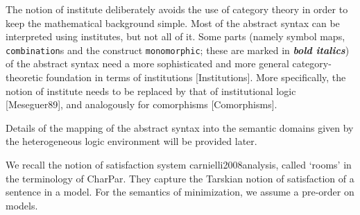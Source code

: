 \documentclass[10pt,%
\ifpretendfinal
final%
\else
draft%
\fi,
]{scrreprt}
\newcommand*{\institutionsOnly}{\bfseries\itshape}
\newcommand*{\syntax}[1]{\texttt{#1}}
\newcommand{\bref}[1]{[\ref{#1}]}
\renewcommand{\bref}[1]{#1}
\begin{document}
The notion of institute deliberately avoids the use of category theory
in order to keep the mathematical background simple.  Most of the
abstract syntax can be interpreted using institutes, but not all of
it. Some parts (namely symbol maps, \syntax{combination}s
 and the construct \syntax{monomorphic};
these are marked in {\institutionsOnly bold italics}) of the abstract
syntax need a more sophisticated and more general category-theoretic
foundation in terms of institutions [\bref{Institutions}]. More
specifically, the notion of institute needs to be replaced by that of
institutional logic [\bref{Meseguer89}], and analogously for
comorphisms [\bref{Comorphisms}].

Details of the mapping of the abstract syntax into the semantic
domains given by the heterogeneous logic environment will be provided later.







We recall the notion of satisfaction system
\bref{carnielli2008analysis}, called `rooms' in the terminology of
\bref{CharPar}. They capture the Tarskian notion of satisfaction of a
sentence in a model. For the semantics of minimization,
we assume a pre-order on models.
\end{document}
